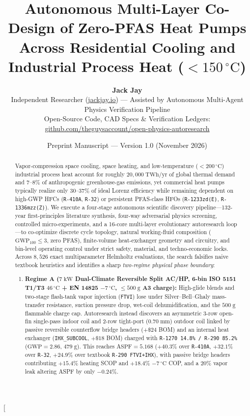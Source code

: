 \documentclass[twocolumn,10pt]{article}
\title{\vspace{-1.4em}\Large\bfseries Autonomous Multi-Layer Co-Design of Zero-PFAS Heat Pumps Across Residential Cooling and Industrial Process Heat ($<150\,^\circ\text{C}$)}
\author{
  \normalsize\textbf{Jack Jay}\\[2pt]
  \small\color{slate} Independent Researcher (\href{https://jackjay.io}{jackjay.io}) --- Assisted by Autonomous Multi-Agent Physics Verification Pipeline\\[-2pt]
  \small\color{slate} Open-Source Code, CAD Specs \& Verification Ledgers: \href{https://github.com/theguysaccount/open-physics-autoresearch}{github.com/theguysaccount/open-physics-autoresearch}
}
\date{\small Preprint Manuscript --- Version 1.0 (November 2026)}
\begin{document}
\twocolumn[
  \begin{@twocolumnfalse}
    \maketitle
    \vspace{-1.0em}
    \begin{abstract}
      \noindent Vapor-compression space cooling, space heating, and low-temperature ($<200\,^\circ\text{C}$) industrial process heat account for roughly $20{,}000\;\text{TWh/yr}$ of global thermal demand and $7\text{--}8\%$ of anthropogenic greenhouse-gas emissions, yet commercial heat pumps typically realize only $30\text{--}37\%$ of ideal Lorenz efficiency while remaining dependent on high-GWP HFCs (\texttt{R-410A}, \texttt{R-32}) or persistent PFAS-class HFOs (\texttt{R-1233zd(E)}, \texttt{R-1336mzz(Z)}). We execute a four-stage autonomous scientific discovery pipeline---132-year first-principles literature synthesis, four-way adversarial physics screening, controlled micro-experiments, and a 16-core multi-layer evolutionary autoresearch loop---to co-optimize discrete cycle topology, natural working-fluid composition ($\text{GWP}_{100}\le 3$, zero PFAS), finite-volume heat-exchanger geometry and circuitry, and bin-level operating control under strict safety, material, and techno-economic locks. Across $8{,}526$ exact multiparameter Helmholtz evaluations, the search falsifies naive textbook heuristics and identifies a sharp \emph{two-regime physical phase boundary}:
      \begin{enumerate}\setlength{\itemsep}{1pt}\setlength{\topsep}{2pt}
        \item \textbf{Regime A ($7\;\text{kW}$ Dual-Climate Reversible Split AC/HP, 6-bin ISO 5151 T1/T3 $46\,^\circ\text{C}$ + EN 14825 $-7\,^\circ\text{C}$, $\le 500\;\text{g}$ A3 charge):} High-glide blends and two-stage flash-tank vapor injection (\texttt{FTVI}) lose under Silver--Bell--Ghaly mass-transfer resistance, suction pressure drop, wet-coil dehumidification, and the $500\;\text{g}$ flammable charge cap. Autoresearch instead discovers an asymmetric 3-row open-fin single-pass indoor coil and 2-row tight-port ($0.70\;\text{mm}$) outdoor coil linked by passive reversible counterflow bridge headers ($+\$24$ BOM) and an internal heat exchanger (\texttt{IHX\_SUBCOOL}, $+\$18$ BOM) charged with \texttt{R-1270 14.8\% / R-290 85.2\%} ($\text{GWP}=2.86$, $479\;\text{g}$). This reaches $\text{ASPF}=5.168$ ($+40.3\%$ over \texttt{R-410A}, $+32.1\%$ over \texttt{R-32}, $+24.9\%$ over textbook \texttt{R-290 FTVI+IHX}), with passive bridge headers contributing $+15.4\%$ heating SCOP and $+18.4\%$ $-7\,^\circ\text{C}$ COP, and a $20\%$ vapor leak altering ASPF by only $-0.24\%$.

\end{enumerate}
\end{abstract}
\end{@twocolumnfalse}
\end{document}
